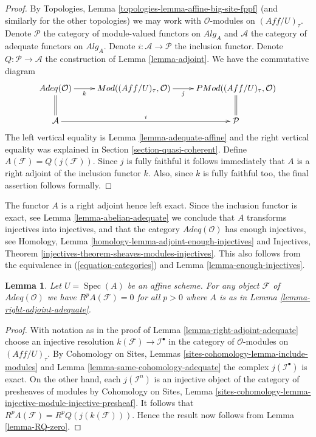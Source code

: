 \documentclass{stacks-project}
\theoremstyle{plain}
\newtheorem{lemma}[subsection]{Lemma}
\theoremstyle{definition}
\theoremstyle{remark}
\numberwithin{equation}{subsection}
\def\Spec{\mathop{\mathrm{Spec}}}
\begin{document}
\begin{proof}
By
Topologies, Lemma \ref{topologies-lemma-affine-big-site-fppf}
(and similarly for the other topologies)
we may work with $\mathcal{O}$-modules on $(\textit{Aff}/U)_\tau$.
Denote $\mathcal{P}$ the category of module-valued
functors on $\textit{Alg}_A$ and $\mathcal{A}$ the category of adequate
functors on $\textit{Alg}_A$. Denote $i : \mathcal{A} \to \mathcal{P}$
the inclusion functor. Denote $Q : \mathcal{P} \to \mathcal{A}$
the construction of Lemma \ref{lemma-adjoint}.
We have the commutative diagram
\begin{equation}
\label{equation-categories}
\vcenter{
\xymatrix{
\textit{Adeq}(\mathcal{O}) \ar[r]_-k \ar@{=}[d] &
\textit{Mod}((\textit{Aff}/U)_\tau, \mathcal{O}) \ar[r]_-j &
\textit{PMod}((\textit{Aff}/U)_\tau, \mathcal{O}) \ar@{=}[d] \\
\mathcal{A} \ar[rr]^-i & & \mathcal{P}
}
}
\end{equation}
The left vertical equality is
Lemma \ref{lemma-adequate-affine}
and the right vertical equality was explained in
Section \ref{section-quasi-coherent}.
Define $A(\mathcal{F}) = Q(j(\mathcal{F}))$.
Since $j$ is fully faithful it follows immediately that $A$
is a right adjoint of the inclusion functor $k$. Also, since
$k$ is fully faithful too, the final assertion follows formally.
\end{proof}

\noindent
The functor $A$ is a right adjoint hence left exact. Since the inclusion
functor is exact, see
Lemma \ref{lemma-abelian-adequate}
we conclude that $A$ transforms injectives into injectives, and that
the category $\textit{Adeq}(\mathcal{O})$ has enough injectives, see
Homology, Lemma \ref{homology-lemma-adjoint-enough-injectives}
and
Injectives, Theorem \ref{injectives-theorem-sheaves-modules-injectives}.
This also follows from the equivalence in
(\ref{equation-categories})
and
Lemma \ref{lemma-enough-injectives}.

\begin{lemma}
\label{lemma-RA-zero}
Let $U = \Spec(A)$ be an affine scheme.
For any object $\mathcal{F}$ of $\textit{Adeq}(\mathcal{O})$
we have $R^pA(\mathcal{F}) = 0$ for all $p > 0$ where $A$ is
as in
Lemma \ref{lemma-right-adjoint-adequate}.
\end{lemma}

\begin{proof}
With notation as in the proof of
Lemma \ref{lemma-right-adjoint-adequate}
choose an injective resolution $k(\mathcal{F}) \to \mathcal{I}^\bullet$
in the category of $\mathcal{O}$-modules on $(\textit{Aff}/U)_\tau$.
By
Cohomology on Sites, Lemmas \ref{sites-cohomology-lemma-include-modules}
and
Lemma \ref{lemma-same-cohomology-adequate}
the complex $j(\mathcal{I}^\bullet)$ is exact.
On the other hand, each $j(\mathcal{I}^n)$ is an injective object
of the category of presheaves of modules by
Cohomology on Sites, Lemma
\ref{sites-cohomology-lemma-injective-module-injective-presheaf}.
It follows that $R^pA(\mathcal{F}) = R^pQ(j(k(\mathcal{F})))$.
Hence the result now follows from
Lemma \ref{lemma-RQ-zero}.
\end{proof}
\end{document}
